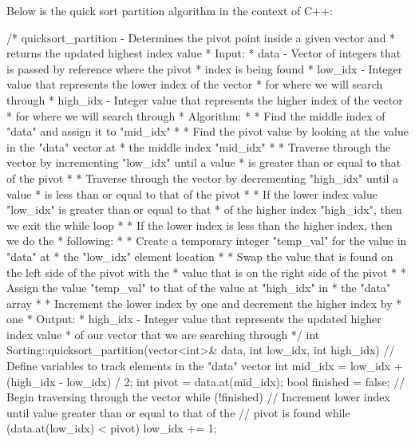 \begin{highlight}

Below is the quick sort partition algorithm in the context of C++:

\begin{code}
/*  quicksort_partition - Determines the pivot point inside a given vector and 
*                         returns the updated highest index value
*   Input:
*     data - Vector of integers that is passed by reference where the pivot 
*            index is being found
*     low_idx - Integer value that represents the lower index of the vector 
*               for where we will search through
*     high_idx - Integer value that represents the higher index of the vector 
*               for where we will search through
*   Algorithm:
*     * Find the middle index of "data" and assign it to "mid_idx"
*     * Find the pivot value by looking at the value in the "data" vector at 
*       the middle index "mid_idx"
*     * Traverse through the vector by incrementing "low_idx" until a value 
*       is greater than or equal to that of the pivot
*     * Traverse through the vector by decrementing "high_idx" until a value 
*       is less than or equal to that of the pivot
*     * If the lower index value "low_idx" is greater than or equal to that 
*       of the higher index "high_idx", then we exit the while loop
*     * If the lower index is less than the higher index, then we do the 
*       following:
*       * Create a temporary integer "temp_val" for the value in "data" at 
*         the "low_idx" element location
*       * Swap the value that is found on the left side of the pivot with the 
*         value that is on the right side of the pivot
*       * Assign the value "temp_val" to that of the value at "high_idx" in 
*         the "data" array
*       * Increment the lower index by one and decrement the higher index by 
*         one
*   Output:
*     high_idx - Integer value that represents the updated higher index value 
*                of our vector that we are searching through
*/
int Sorting::quicksort_partition(vector<int>& data, int low_idx, int high_idx){
    // Define variables to track elements in the "data" vector
    int mid_idx = low_idx + (high_idx - low_idx) / 2;
    int pivot = data.at(mid_idx);
    bool finished = false;
    // Begin traversing through the vector
    while (!finished) {
    // Increment lower index until value greater than or equal to that of the 
    // pivot is found
    while (data.at(low_idx) < pivot) {
        low_idx += 1;
    }
}}
\end{code}
\end{highlight}
